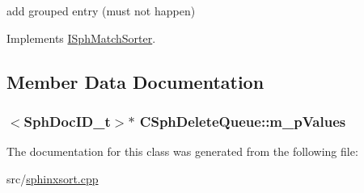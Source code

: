 add grouped entry (must not happen) 



Implements \hyperlink{classISphMatchSorter_aefd6f5b67faf49cc6d7d52bba8679fe0}{I\-Sph\-Match\-Sorter}.



\subsection{Member Data Documentation}
\hypertarget{classCSphDeleteQueue_acb886657ed713ddfa67b80e1e30c435a}{
\subsubsection[{m\-\_\-p\-Values}]{$<${\bf Sph\-Doc\-I\-D\-\_\-t}$>$$\ast$ C\-Sph\-Delete\-Queue\-::m\-\_\-p\-Values\hspace{0.3cm}{\ttfamily [private]}}}\label{classCSphDeleteQueue_acb886657ed713ddfa67b80e1e30c435a}


The documentation for this class was generated from the following file\-:\begin{DoxyCompactItemize}
\item 
src/\hyperlink{sphinxsort_8cpp}{sphinxsort.\-cpp}\end{DoxyCompactItemize}
